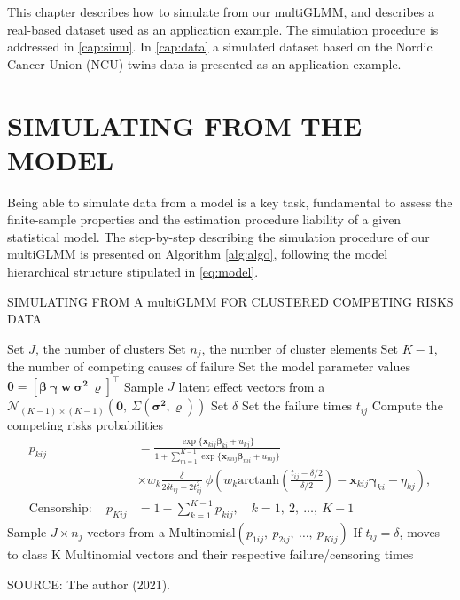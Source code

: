 This chapter describes how to simulate from our multiGLMM, and describes
a real-based dataset used as an application example. The simulation
procedure is addressed in \autoref{cap:simu}. In \autoref{cap:data} a
simulated dataset based on the Nordic Cancer Union (NCU) twins data is
presented as an application example.

\section{SIMULATING FROM THE MODEL}
\label{cap:simu}

Being able to simulate data from a model is a key task, fundamental to
assess the finite-sample properties and the estimation procedure
liability of a given statistical model. The step-by-step describing the
simulation procedure of our multiGLMM is presented on Algorithm
\autoref{alg:algo}, following the model hierarchical structure
stipulated in \autoref{eq:model}.

\begin{algorithm}[H]
 \caption{SIMULATING FROM A \(\text{multiGLMM}\) FOR CLUSTERED COMPETING
          RISKS DATA}
 \label{alg:algo}
 \begin{algorithmic}[1]
  \State
   Set \(J\), the number of clusters
  \State
   Set \(n_{j}\), the number of cluster elements
  \State
   Set \(K-1\), the number of competing causes of failure
  \State
   Set the model parameter values \(\bm{\theta} =
   [\bm{\beta}~\bm{\gamma}~\bm{w}~\bm{\sigma^{2}}~\bm{\varrho}]^{\top}\)
  \State
   Sample \(J\) latent effect vectors from a
   \(\mathcal{N}_{(K-1)\times(K-1)}(\bm{0},~\Sigma(\bm{\sigma^{2}},
     \bm{\varrho}))\)
  \State
   Set \(\delta\)
  \State
   Set the failure times \(t_{ij}\)
  \State
   Compute the competing risks probabilities
   \begin{align*}
    p_{kij} &=
    \frac{\exp\{\bm{x}_{kij}\bm{\beta}_{ki} + u_{kj}\}}{
          1 +
          \sum_{m=1}^{K-1}\exp\{\bm{x}_{mij}\bm{\beta}_{mi} + u_{mj}\}
         }\\
    &\times w_{k}\frac{\delta}{2\delta t_{ij} - 2t_{ij}^{2}}~
     \phi\left(w_{k}
      \text{arctanh}\left(\frac{t_{ij}-\delta/2}{\delta/2}\right) -
      \bm{x}_{kij}\bm{\gamma}_{ki} - \eta_{kj}
     \right),\\
    \text{Censorship}: \quad
    p_{Kij} &=
    1 - \sum_{k=1}^{K-1} p_{kij}, \quad k = 1,~2,~\dots,~K-1
   \end{align*}
  \State
   Sample \(J\times n_{j}\) vectors from a
   \(\text{Multinomial}(p_{1ij},~p_{2ij},~\dots,~p_{Kij})\)
  \State
   If \(t_{ij} = \delta\), moves to class K
  \State
   \Return
    Multinomial vectors and their respective failure/censoring times
 \end{algorithmic}
\end{algorithm}
\vspace{-1cm}
\begin{footnotesize}
  \begin{center}
    SOURCE: The author (2021).
  \end{center}
\end{footnotesize}

